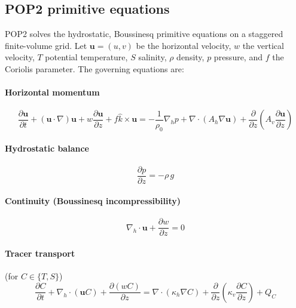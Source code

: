 \documentclass[11pt]{article}
\begin{document}
\subsection{POP2 primitive equations}
POP2 solves the hydrostatic, Boussinesq primitive equations on a staggered
finite-volume grid. Let $\mathbf{u}=(u,v)$ be the horizontal velocity,
$w$ the vertical velocity, $T$ potential temperature, $S$ salinity,
$\rho$ density, $p$ pressure, and $f$ the Coriolis parameter. The governing
equations are:

\paragraph{Horizontal momentum}
\begin{equation}
\frac{\partial \mathbf{u}}{\partial t}
  + (\mathbf{u}\cdot\nabla)\mathbf{u}
  + w\frac{\partial \mathbf{u}}{\partial z}
  + f\hat{k}\times\mathbf{u}
  = -\frac{1}{\rho_0}\nabla_h p
  + \nabla\cdot(A_h\nabla\mathbf{u})
  + \frac{\partial}{\partial z}\!\left(A_v\frac{\partial\mathbf{u}}{\partial z}\right)
\end{equation}

\paragraph{Hydrostatic balance}
\begin{equation}
\frac{\partial p}{\partial z} = -\rho\, g
\end{equation}

\paragraph{Continuity (Boussinesq incompressibility)}
\begin{equation}
\nabla_h\cdot\mathbf{u} + \frac{\partial w}{\partial z} = 0
\label{eq:continuity}
\end{equation}

\paragraph{Tracer transport} (for $C\in\{T,S\}$)
\begin{equation}
\frac{\partial C}{\partial t}
  + \nabla_h\cdot(\mathbf{u}C)
  + \frac{\partial(wC)}{\partial z}
  = \nabla\cdot(\kappa_h\nabla C)
  + \frac{\partial}{\partial z}\!\left(\kappa_v\frac{\partial C}{\partial z}\right)
  + Q_C
\end{equation}
\end{document}
